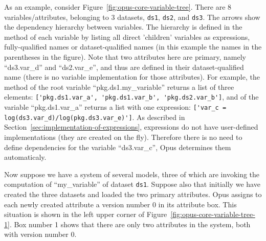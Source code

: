 As an example, consider Figure~\ref{fig:opus-core-variable-tree}. There are 8
variables/attributes,  belonging to 3 datasets, \verb|ds1|, \verb|ds2|, and
\verb|ds3|.  The arrows show the dependency hierarchy between variables. The
hierarchy is defined in the method  of each variable
by listing all direct 'children' variables as expressions, fully-qualified names or dataset-qualified names (in
this example the names in the parentheses in the figure). Note that two
attributes here are primary, namely ``ds3.var_d'' and ``ds2.var_e'', and
thus are defined in their dataset-qualified name (there is no variable
implementation for those attributes). For example, the  method of the root variable 
``pkg.ds1.my_variable'' returns a list of three elements: \verb|['pkg.ds1.var_a', 'pkg.ds1.var_b', 'pkg.ds2.var_b']|, 
and  of the variable ``pkg.ds1.var_a'' returns a list with one expression:
\verb|['var_c = log(ds3.var_d)/log(pkg.ds3.var_e)']|. As described in Section~\ref{sec:implementation-of-expressions}, 
expressions do not have user-defined implementations (they are created on the fly). Therefore there is 
no need to define dependencies for the variable ``ds3.var_c'', Opus determines them automaticaly. 

Now suppose we have a system of several models, three of which are invoking
the computation of ``my_variable'' of dataset \verb|ds1|. Suppose also that
initially we have created the three datasets and loaded the two primary
attributes.  Opus assigns to each newly created attribute a version number 0 in
its attribute box.  This situation is shown in the left upper corner of
Figure~\ref{fig:opus-core-variable-tree-1}. Box number 1 shows that there are only
two attributes in the system, both with version number 0.

